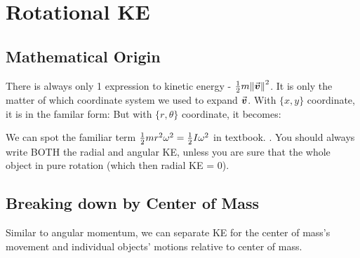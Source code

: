 \documentclass[class=article, crop=false, 12pt]{standalone}
\begin{document}
\section{Rotational KE}

\subsection{Mathematical Origin}
There is always only 1 expression to kinetic energy - $\frac{1}{2} m\norm{\va*{v}}^2$. 
It is only the matter of which coordinate system we used to expand $\va*{v}$. 
With $\{x,y\}$ coordinate, it is in the familar form:
But with $\{r,\theta\}$ coordinate, it becomes:

We can spot the familiar term $ \frac{1}{2} mr^2\omega^2 = \frac{1}{2} I\omega^2$ in textbook. 
. 
You should always write BOTH the radial and angular KE,
unless you are sure that the whole object in pure rotation (which then radial KE = 0).


\subsection{Breaking down by Center of Mass}

Similar to angular momentum, we can separate KE for the center of mass's movement 
and individual objects' motions relative to center of mass.

\end{document}
